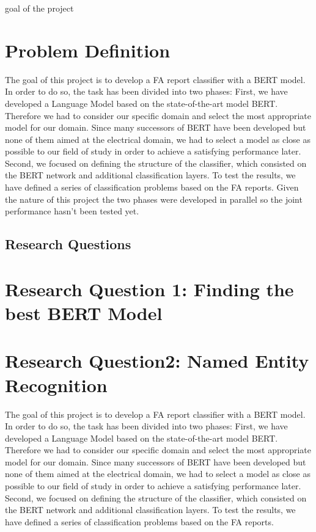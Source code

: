 goal of the project

\section{Problem Definition}
The goal of this project is to develop a FA report classifier with a BERT model.
In order to do so, the task has been divided into two phases: \newline
First, we have developed a Language Model based on the state-of-the-art model BERT. Therefore we had to consider our specific domain and select the most appropriate model for our domain. Since many successors of BERT have been developed but none of them aimed at the electrical domain, we had to select a model as close as possible to our field of study in order to achieve a satisfying performance later. \newline
Second, we focused on defining the structure of the classifier, which consisted on the BERT network and additional classification layers. To test the results, we have defined a series of classification problems based on the FA reports. \newline
Given the nature of this project the two phases were developed in parallel so the joint performance hasn't been tested yet. \newline

\subsection{Research Questions}

\section{Research Question 1: Finding the best BERT Model}
\section{Research Question2: Named Entity Recognition}


The goal of this project is to develop a FA report classifier with a BERT model.
In order to do so, the task has been divided into two phases: \newline
First, we have developed a Language Model based on the state-of-the-art model BERT. Therefore we had to consider our specific domain and select the most appropriate model for our domain. Since many successors of BERT have been developed but none of them aimed at the electrical domain, we had to select a model as close as possible to our field of study in order to achieve a satisfying performance later. \newline
Second, we focused on defining the structure of the classifier, which consisted on the BERT network and additional classification layers. To test the results, we have defined a series of classification problems based on the FA reports. \newline

